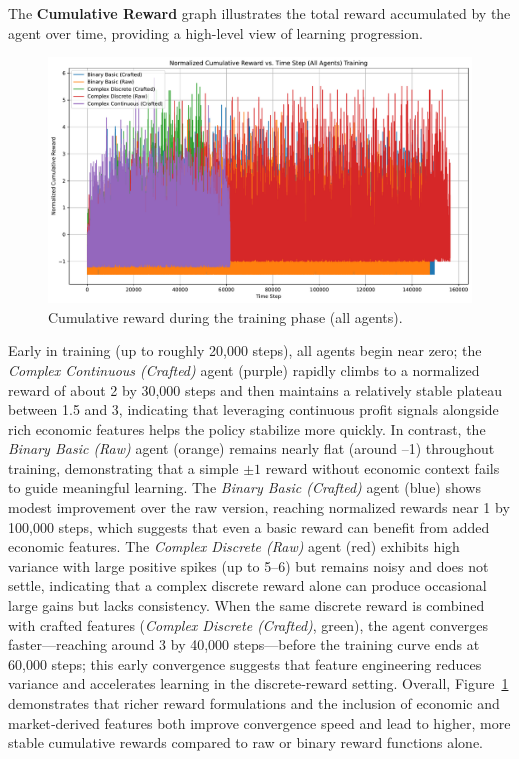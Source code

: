 \documentclass[sigconf]{acmart}
\begin{document}
\bigskip

The \textbf{Cumulative Reward} graph illustrates the total reward accumulated by the agent over time, providing a high-level view of learning progression. 

\begin{figure}[t]
  \centering
  \includegraphics[width=\textwidth]{cumulative_reward_all_training.pdf}
  \caption{Cumulative reward during the training phase (all agents).}
  \label{fig:cumulative_reward_all_training}
\end{figure}

\bigskip

Early in training (up to roughly 20,000 steps), all agents begin near zero; the \emph{Complex Continuous (Crafted)} agent (purple) rapidly climbs to a normalized reward of about 2 by 30,000 steps and then maintains a relatively stable plateau between 1.5 and 3, indicating that leveraging continuous profit signals alongside rich economic features helps the policy stabilize more quickly. In contrast, the \emph{Binary Basic (Raw)} agent (orange) remains nearly flat (around –1) throughout training, demonstrating that a simple $\pm1$ reward without economic context fails to guide meaningful learning. The \emph{Binary Basic (Crafted)} agent (blue) shows modest improvement over the raw version, reaching normalized rewards near 1 by 100,000 steps, which suggests that even a basic reward can benefit from added economic features. The \emph{Complex Discrete (Raw)} agent (red) exhibits high variance with large positive spikes (up to 5–6) but remains noisy and does not settle, indicating that a complex discrete reward alone can produce occasional large gains but lacks consistency. When the same discrete reward is combined with crafted features (\emph{Complex Discrete (Crafted)}, green), the agent converges faster—reaching around 3 by 40,000 steps—before the training curve ends at 60,000 steps; this early convergence suggests that feature engineering reduces variance and accelerates learning in the discrete‐reward setting. Overall, Figure~\ref{fig:cumulative_reward_all_training} demonstrates that richer reward formulations and the inclusion of economic and market‐derived features both improve convergence speed and lead to higher, more stable cumulative rewards compared to raw or binary reward functions alone.
\end{document}
